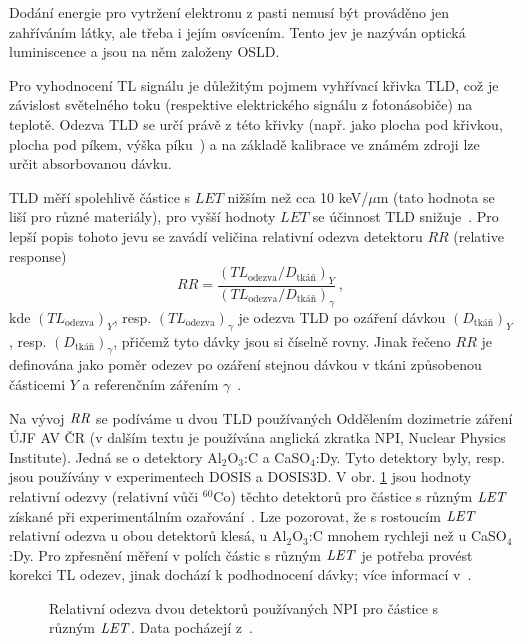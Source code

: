Dodání energie pro vytržení elektronu z pasti nemusí být prováděno jen zahříváním látky, ale třeba i jejím osvícením. Tento jev je nazýván optická luminiscence a jsou na něm založeny OSLD.

Pro vyhodnocení TL signálu je důležitým pojmem vyhřívací křivka TLD, což je závislost světelného toku (respektive elektrického signálu z fotonásobiče) na teplotě. Odezva TLD se určí právě z této křivky (např. jako plocha pod křivkou, plocha pod píkem, výška píku~\cite{dosis}) a na základě kalibrace ve známém zdroji lze určit absorbovanou dávku.

TLD měří spolehlivě částice s $\mathit{LET}$ nižším než cca 10 keV/$\mu$m (tato hodnota se liší pro různé materiály), pro vyšší hodnoty $\mathit{LET}$ se účinnost TLD snižuje~\cite{passDetectors}. Pro lepší popis tohoto jevu se zavádí veličina relativní odezva detektoru $\mathit{RR}$ (relative response)
\begin{equation}
  \mathit{RR}=\frac{\left(TL_{\text{odezva}}/D_{\text{tkáň}}\right)_Y}{\left(TL_{\text{odezva}}/D_{\text{tkáň}}\right)_{\gamma}}\,,
  \label{eq:detektory_TLD_RR}
\end{equation}
kde $(TL_{\text{odezva}})_Y$, resp. $(TL_{\text{odezva}})_{\gamma}$ je odezva TLD po ozáření dávkou $(D_{\text{tkáň}})_Y$, resp. $(D_{\text{tkáň}})_{\gamma}$, přičemž tyto dávky jsou si číselně rovny. Jinak řečeno $\mathit{RR}$ je definována jako poměr odezev po ozáření stejnou dávkou v tkáni způsobenou částicemi $Y$ a referenčním zářením $\gamma$~\cite{TLD_RR}. 

Na vývoj $\mathit{RR}$ se podíváme u dvou TLD používaných Oddělením dozimetrie záření ÚJF AV ČR (v dalším textu je používána anglická zkratka NPI, Nuclear Physics Institute). Jedná se o detektory Al$_2$O$_3$:C a CaSO$_4$:Dy. Tyto detektory byly, resp. jsou používány v experimentech DOSIS a DOSIS3D. V obr. \ref{fig:detektory_TLD_RR} jsou hodnoty relativní odezvy (relativní vůči $^{60}$Co) těchto detektorů pro částice s různým $\mathit{LET}$ získané při experimentálním ozařování~\cite{dataTLD_RR}. Lze pozorovat, že s rostoucím $\mathit{LET}$ relativní odezva u obou detektorů klesá, u Al$_2$O$_3$:C mnohem rychleji než u CaSO$_4$:Dy. Pro zpřesnění měření v polích částic s různým $\mathit{LET}$ je potřeba provést korekci TL odezev, jinak dochází k podhodnocení dávky; více informací v~\cite{TLD_RR}.
\begin{figure}[H]
  \centering
  
  \caption{Relativní odezva dvou detektorů používaných NPI pro částice s různým $\mathit{LET}$. Data pocházejí z~\cite{dataTLD_RR}.}
  \label{fig:detektory_TLD_RR}
\end{figure}
